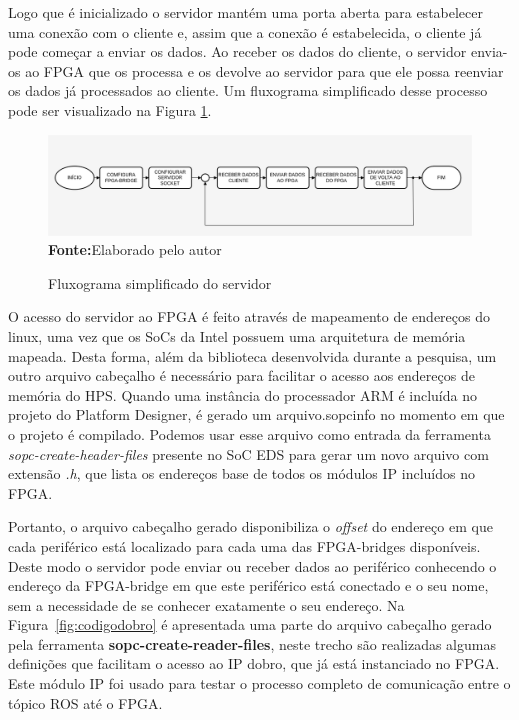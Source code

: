 Logo que é inicializado o servidor mantém uma porta aberta para estabelecer uma conexão com o cliente e, assim que a conexão é estabelecida, o cliente já pode começar a enviar os dados. Ao receber os dados do cliente, o servidor envia-os ao FPGA que os processa e os devolve ao servidor para que ele possa reenviar os dados já processados ao cliente. Um fluxograma simplificado desse processo pode ser visualizado na Figura \ref{fig:fluxoServidor}.

\begin{figure}[ht]
	\caption{Fluxograma simplificado do servidor}
	\begin{center}
		\includegraphics[scale=0.41]{imagens/fluxogramaServidor.png}\\
		{\small \textbf{Fonte:}Elaborado pelo autor}
    \end{center}\label{fig:fluxoServidor}
\end{figure} 

O acesso do servidor ao FPGA é feito através de mapeamento de endereços do linux, uma vez que os SoCs da Intel possuem uma arquitetura de memória mapeada. Desta forma, além da biblioteca desenvolvida durante a pesquisa, um outro arquivo cabeçalho é necessário para facilitar o acesso aos endereços de memória do HPS\@. Quando uma instância do processador ARM é incluída no projeto do Platform Designer, é gerado um arquivo.sopcinfo no momento em que o projeto é compilado. Podemos usar esse arquivo como entrada da ferramenta \textit{sopc-create-header-files} presente no SoC EDS para gerar um novo arquivo com extensão \textit{.h}, que lista os endereços base de todos os módulos IP incluídos no FPGA\@. 

Portanto, o arquivo cabeçalho gerado disponibiliza o \textit{offset} do endereço em que cada periférico está localizado para cada uma das FPGA-bridges disponíveis. Deste modo o servidor pode enviar ou receber dados ao periférico conhecendo o endereço da FPGA-bridge em que este periférico está conectado e o seu nome, sem a necessidade de se conhecer exatamente o seu endereço. Na Figura~\ref{fig:codigodobro} é apresentada uma parte do arquivo cabeçalho gerado pela ferramenta \textbf{sopc-create-reader-files}, neste trecho são realizadas algumas definições que facilitam o acesso ao IP dobro, que já está instanciado no FPGA\@. Este módulo IP foi usado para testar o processo completo de comunicação entre o tópico ROS até o FPGA\@.

